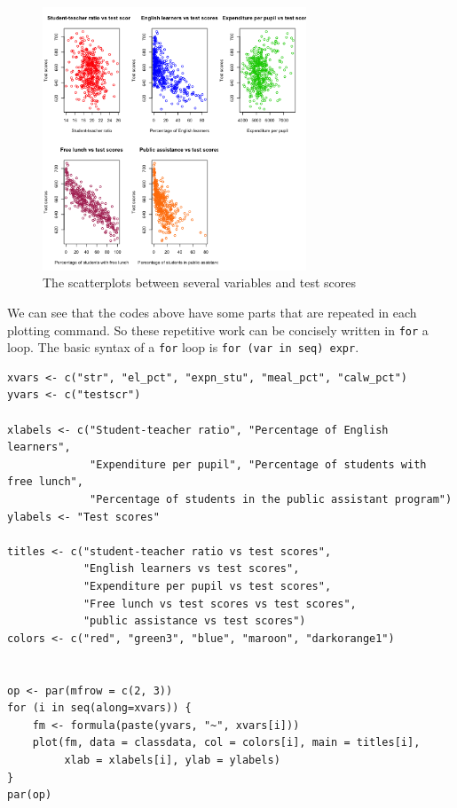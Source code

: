 \documentclass[11pt]{article}
\begin{document}
\begin{figure}[htbp]
\centering
\includegraphics[width=0.7\textwidth,height=0.5\textheight]{./scplotmat.png}
\caption{The scatterplots between several variables and test scores}
\end{figure}


We can see that the codes above have some parts that are repeated in
each plotting command. So these repetitive work can be concisely
written in \texttt{for} a loop. The basic syntax of a \texttt{for} loop is
\texttt{for (var in seq) expr}.

\begin{verbatim}
xvars <- c("str", "el_pct", "expn_stu", "meal_pct", "calw_pct")
yvars <- c("testscr")

xlabels <- c("Student-teacher ratio", "Percentage of English learners",
             "Expenditure per pupil", "Percentage of students with free lunch",
             "Percentage of students in the public assistant program")
ylabels <- "Test scores"

titles <- c("student-teacher ratio vs test scores",
            "English learners vs test scores",
            "Expenditure per pupil vs test scores",
            "Free lunch vs test scores vs test scores",
            "public assistance vs test scores")
colors <- c("red", "green3", "blue", "maroon", "darkorange1")


op <- par(mfrow = c(2, 3))
for (i in seq(along=xvars)) {
    fm <- formula(paste(yvars, "~", xvars[i]))
    plot(fm, data = classdata, col = colors[i], main = titles[i],
         xlab = xlabels[i], ylab = ylabels)
}
par(op)
\end{verbatim}
\end{document}

